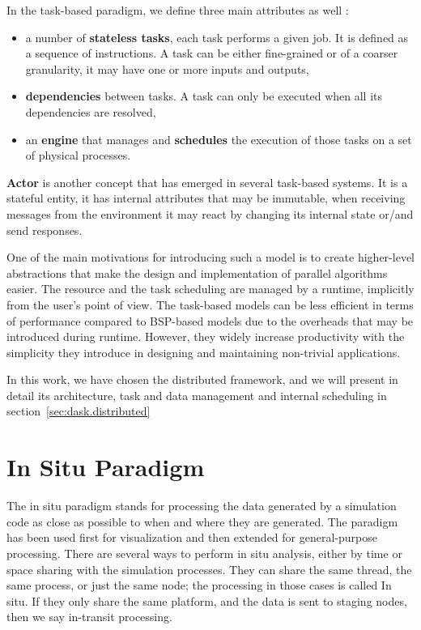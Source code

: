 

In the task-based paradigm, we define three main attributes as well :
\begin{itemize}
    \item a number of \textbf{stateless tasks}, each task performs a given job. It is defined as a sequence of instructions. A task can be either fine-grained or of a coarser granularity, it may have one or more inputs and outputs,
    \item \textbf{dependencies} between tasks. A task can only be executed when all its dependencies are resolved,
    \item an \textbf{engine} that manages and \textbf{schedules} the execution of those tasks on a set of physical processes.
\end{itemize}

\textbf{Actor} is another concept that has emerged in several task-based systems. It is a stateful entity, it has internal attributes 
that may be immutable, when receiving messages from the environment it may react by changing its internal state or/and send responses. 

One of the main motivations for introducing such a model is to create higher-level abstractions that make the design and implementation of parallel algorithms easier. The resource and the task scheduling are managed by a runtime, implicitly from the user's point of view. The task-based models can be less efficient in terms of performance compared to BSP-based models due to the overheads that may be introduced during runtime. However, they widely increase productivity with the simplicity they introduce in designing and maintaining non-trivial applications.   

In this work, we have chosen the \dask distributed framework, and we will present in detail its architecture, task and data management and internal scheduling in section~\ref{sec:dask.distributed} 

\section{In Situ Paradigm}\label{sec:insitu}

The in situ paradigm stands for processing the data generated by a simulation code as close as possible to when and where they are generated. The paradigm has been used first for visualization\cite{InSituLiuMa:2007} and then extended for general-purpose processing. There are several ways to perform in situ analysis, either by time or space sharing with the simulation processes. They can share the same thread, the same process, or just the same node; the processing in those cases is called In situ. If they only share the same platform, and the data is sent to staging nodes, then we say in-transit processing.


